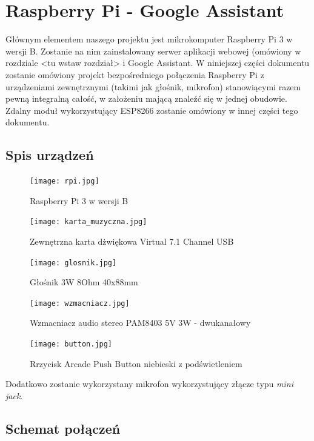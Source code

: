 
\section{Raspberry Pi - Google Assistant}

Głównym elementem naszego projektu jest mikrokomputer Raspberry Pi 3 w wersji B. Zostanie na nim zainstalowany serwer aplikacji webowej (omówiony w rozdziale <tu wstaw rozdział> i Google Assistant. W niniejszej części dokumentu zostanie omówiony projekt bezpośredniego połączenia Raspberry Pi z urządzeniami zewnętrznymi (takimi jak głośnik, mikrofon) stanowiącymi razem pewną integralną całość, w założeniu mającą znaleźć się w jednej obudowie. Zdalny moduł wykorzystujący ESP8266 zostanie omówiony w innej części tego dokumentu.

\subsection{Spis urządzeń}

	\begin{figure}[H]
	\centering
	\texttt{[image: rpi.jpg]}
	\caption{Raspberry Pi 3 w wersji B}
	\end{figure}
	
	\begin{figure}[H]
	\centering
	\texttt{[image: karta\_muzyczna.jpg]}
	\caption{Zewnętrzna karta dżwiękowa Virtual 7.1 Channel USB }
	\end{figure}
	
	\begin{figure}[H]
	\centering
	\texttt{[image: glosnik.jpg]}
	\caption{Głośnik 3W 8Ohm 40x88mm}
	\end{figure}
	
	\begin{figure}[H]
	\centering
	\texttt{[image: wzmacniacz.jpg]}
	\caption{Wzmacniacz audio stereo PAM8403 5V 3W - dwukanałowy}
	\end{figure}
	
	\begin{figure}[H]
	\centering
	\texttt{[image: button.jpg]}
	\caption{Rrzycisk Arcade Push Button niebieski z podświetleniem}
	\end{figure}

Dodatkowo zostanie wykorzystany mikrofon wykorzystujący złącze typu \emph{mini jack}.

\subsection{Schemat połączeń}

